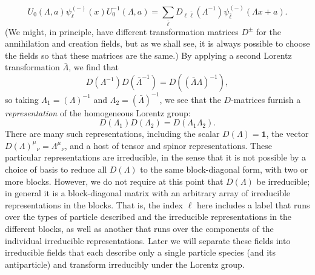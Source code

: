 \begin{equation}
  U_0(\Lambda,a)\psi^{(-)}_\ell(x)U_0^{-1}(\Lambda,a)
  =\sum_{\bar\ell}D_{\ell\bar\ell}(\Lambda^{-1})
  \psi^{(-)}_{\bar\ell}(\Lambda x+a).
  \tag{5.1.7}\label{eq:5.1.7}
\end{equation}
(We might, in principle, have different transformation matrices $D^\pm$ for the
annihilation and creation fields, but as we shall see, it is always possible
to choose the fields so that these matrices are the same.) By applying a
second Lorentz transformation $\bar\Lambda$, we find that
\[
  D(\Lambda^{-1})D(\bar\Lambda^{-1})=D((\bar\Lambda\Lambda)^{-1}),
\]
so taking $\Lambda_1=(\Lambda)^{-1}$ and $\Lambda_2=(\bar\Lambda)^{-1}$,
we see that the $D$-matrices furnish a \textit{representation} of the homogeneous
Lorentz group:
\begin{equation}
  D(\Lambda_1)D(\Lambda_2)=D(\Lambda_1\Lambda_2).
  \tag{5.1.8}\label{eq:5.1.8}
\end{equation}
There are many such representations, including the scalar $D(\Lambda)=\mathbf{1}$,
the vector $D(\Lambda)^\mu{}_{\nu}=\Lambda^\mu{}_{\nu}$, and a host of tensor
and spinor representations. These particular representations are irreducible,
in the sense that it is not possible by a choice of basis to reduce all
$D(\Lambda)$ to the same block-diagonal form, with two or more blocks. However,
we do not require at this point that $D(\Lambda)$ be irreducible; in general it
is a block-diagonal matrix with an arbitrary array of irreducible representations
in the blocks. That is, the index $\ell$ here includes a label that runs over
the types of particle described and the irreducible representations in the
different blocks, as well as another that runs over the components of the
individual irreducible representations. Later we will separate these fields
into irreducible fields that each describe only a single particle species
(and its antiparticle) and transform irreducibly under the Lorentz group.


